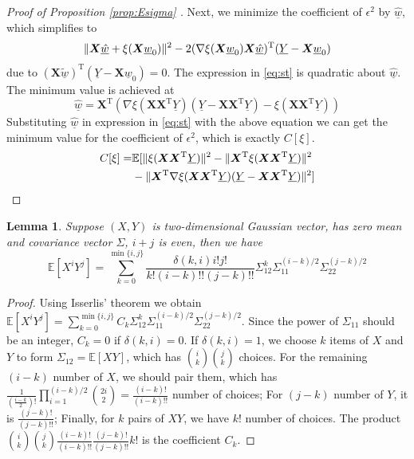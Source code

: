 \documentclass[conference]{IEEEtran}
\newtheorem{lemma}{Lemma}
\DeclarePairedDelimiter\norm{\lVert}{\rVert}
\def\E{\mathbb{E}}
\def\T{\mathrm{T}}
\begin{document}
\begin{proof}[Proof of Proposition \ref{prop:Esigma} ]
Next, we minimize the coefficient of $\epsilon^2$ by $\underline{\hat{w}}$, which simplifies to 
\begin{equation}\label{eq:st}
\norm{\bm{X}\underline{\hat{w}} + \xi(\bm{X} \underline{w}_0)}^2-
2 (
\nabla \xi(\bm{X} \underline{w}_0)\bm{X}\underline{\hat{w}})^\T(\underline{Y}-\bm{X} \underline{w}_0)
\end{equation}
due to $(\bm{X}\underline{\tilde{w}})^\T (\underline{Y}-\bm{X}\underline{w}_0) = 0 $.
The expression in \eqref{eq:st} is quadratic about $\underline{\hat{w}}$. The minimum value is achieved  at
$$
\underline{\hat{w}} =  \bm{X}^\T(\nabla\xi(\bm{X}\bm{X}^\T \underline{Y})
(\underline{Y}-\bm{X}\bm{X}^\T \underline{Y}) - \xi(\bm{X}\bm{X}^\T \underline{Y}))
$$
Substituting $\underline{\hat{w}}$ in expression in \eqref{eq:st} with the above equation we can get the minimum value for the coefficient of $\epsilon^2$, which is exactly $C[\xi]$.
\begin{align*}
C[\xi] = & \E[\norm{\xi(\bm{X}\bm{X}^\T\underline{Y})}^2 -
\norm{\bm{X}^\T\xi(\bm{X}\bm{X}^\T\underline{Y})}^2 \\
& -
\norm{\bm{X}^\T \nabla\xi(\bm{X}\bm{X}^\T\underline{Y})(\underline{Y}-\bm{X}\bm{X}^\T\underline{Y})}^2]
\end{align*}
\end{proof}
\begin{lemma}\label{lemma:Isserlis2}
     Suppose $(X,Y)$ is two-dimensional Gaussian vector,
     has zero mean and covariance vector $\Sigma$, $ i + j $ is even, then we have
\begin{equation*}
    \E[X^i Y^j] =
    \sum_{k=0}^{\min\{i,j\}}
    \frac{\delta(k, i) i! j!}{k! (i-k)!!(j-k)!!}
    \Sigma_{12}^k \Sigma_{11}^{(i-k)/2}\Sigma_{22}^{(j-k)/2}
\end{equation*}
\end{lemma}
\begin{proof}
Using Isserlis' theorem \cite{isserlis1918formula} we obtain
$  \E[X^i Y^j] = \sum_{k=0}^{\min\{i,j\}} C_k \Sigma_{12}^k \Sigma_{11}^{(i-k)/2}\Sigma_{22}^{(j-k)/2}$. Since the power of $\Sigma_{11}$ should be an integer, $C_k = 0$ if $\delta(k, i) = 0$. If $\delta(k, i) = 1$, we choose $k$ items of $X$ and $Y$ to form $\Sigma_{12} = \E[XY]$, which has $\binom{i}{k}\binom{j}{k}$ choices. For the remaining $(i-k)$ number of $X$, we should pair them, which has $\frac{1}{(\frac{i-k}{2})!}\prod_{i=1}^{(i-k)/2} \binom{2i}{2} = \frac{(i-k)!}{(i-k)!!}$ number of choices; For $(j-k)$ number of $Y$, it is $\frac{(j-k)!}{(j-k)!!}$; Finally, for $k$ pairs of $XY$, we have $k!$ number of choices. The product $\binom{i}{k}\binom{j}{k}\frac{(i-k)!}{(i-k)!!}\frac{(j-k)!}{(j-k)!!}k!$ is the coefficient $C_k$.
\end{proof}
\end{document}
